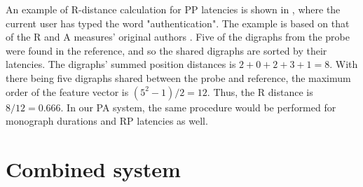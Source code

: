 An example of R-distance calculation for PP latencies is shown in , where the current user has typed the word "authentication". The example is based on that of the R and A measures' original authors \cite{gnp}.
Five of the digraphs from the probe were found in the reference, and so the shared digraphs are sorted by their latencies.
The digraphs' summed position distances is $2 + 0 + 2 + 3 + 1 = 8$.
With there being five digraphs shared between the probe and reference, the maximum order of the feature vector is $(5^2 - 1)/2 = 12$.
Thus, the R distance is $8/12 = 0.666$.
In our PA system, the same procedure would be performed for monograph durations and RP latencies as well.












\section{Combined system}



%




%
%
%
